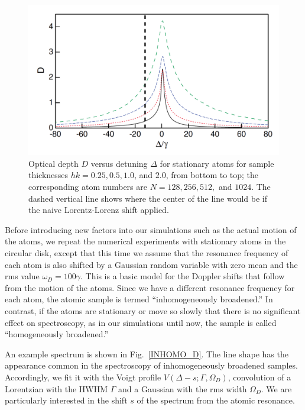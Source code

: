 \begin{figure}[h!]
\begin{center}
\includegraphics[width=\textwidth]{homo_D.pdf}
\end{center}
\caption{Optical depth $D$ versus detuning $\Delta$ for stationary atoms for sample thicknesses $hk=0.25, 0.5, 1.0$, and $2.0$, from bottom to top; the corresponding atom numbers are $N=128, 256, 512,$ and $1024$. The dashed vertical line shows where the center of the line would be if the naive Lorentz-Lorenz shift applied.}
\label{HOMO_D}
\end{figure}

Before introducing new factors into our simulations such as the actual motion of the atoms, we  repeat the numerical experiments with stationary atoms in the circular disk, except that this time we assume that the resonance frequency of each atom is also shifted by a Gaussian random variable with zero mean and the rms value $\omega_D=100\gamma$. This is a basic model for the Doppler shifts that follow from the motion of the atoms. Since we have a different resonance frequency for each atom, the atomic sample is termed ``inhomogeneously broadened.'' In contrast, if the atoms are stationary or move so slowly that there is no significant effect on spectroscopy, as in our simulations until now, the sample is called ``homogeneously broadened.''

An example spectrum is shown in Fig.~\ref{INHOMO_D}. The line shape has the appearance common in the spectroscopy of inhomogeneously broadened samples. Accordingly, we fit it with the Voigt profile $V(\Delta-s;\Gamma,\Omega_D)$, convolution of a Lorentzian with the HWHM $\Gamma$ and a Gaussian with the rms width $\Omega_D$. We are particularly interested in the shift $s$ of the spectrum from the atomic resonance.

